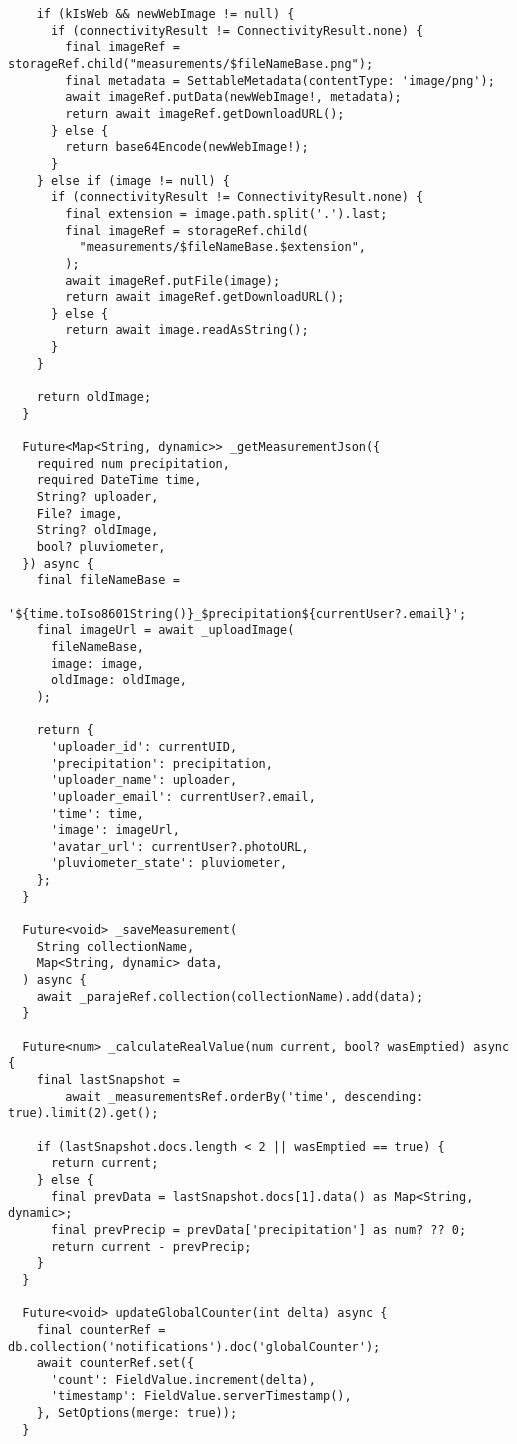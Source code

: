 \begin{verbatim}
    if (kIsWeb && newWebImage != null) {
      if (connectivityResult != ConnectivityResult.none) {
        final imageRef = storageRef.child("measurements/$fileNameBase.png");
        final metadata = SettableMetadata(contentType: 'image/png');
        await imageRef.putData(newWebImage!, metadata);
        return await imageRef.getDownloadURL();
      } else {
        return base64Encode(newWebImage!);
      }
    } else if (image != null) {
      if (connectivityResult != ConnectivityResult.none) {
        final extension = image.path.split('.').last;
        final imageRef = storageRef.child(
          "measurements/$fileNameBase.$extension",
        );
        await imageRef.putFile(image);
        return await imageRef.getDownloadURL();
      } else {
        return await image.readAsString();
      }
    }

    return oldImage;
  }

  Future<Map<String, dynamic>> _getMeasurementJson({
    required num precipitation,
    required DateTime time,
    String? uploader,
    File? image,
    String? oldImage,
    bool? pluviometer,
  }) async {
    final fileNameBase =
        '${time.toIso8601String()}_$precipitation${currentUser?.email}';
    final imageUrl = await _uploadImage(
      fileNameBase,
      image: image,
      oldImage: oldImage,
    );

    return {
      'uploader_id': currentUID,
      'precipitation': precipitation,
      'uploader_name': uploader,
      'uploader_email': currentUser?.email,
      'time': time,
      'image': imageUrl,
      'avatar_url': currentUser?.photoURL,
      'pluviometer_state': pluviometer,
    };
  }

  Future<void> _saveMeasurement(
    String collectionName,
    Map<String, dynamic> data,
  ) async {
    await _parajeRef.collection(collectionName).add(data);
  }

  Future<num> _calculateRealValue(num current, bool? wasEmptied) async {
    final lastSnapshot =
        await _measurementsRef.orderBy('time', descending: true).limit(2).get();

    if (lastSnapshot.docs.length < 2 || wasEmptied == true) {
      return current;
    } else {
      final prevData = lastSnapshot.docs[1].data() as Map<String, dynamic>;
      final prevPrecip = prevData['precipitation'] as num? ?? 0;
      return current - prevPrecip;
    }
  }

  Future<void> updateGlobalCounter(int delta) async {
    final counterRef = db.collection('notifications').doc('globalCounter');
    await counterRef.set({
      'count': FieldValue.increment(delta),
      'timestamp': FieldValue.serverTimestamp(),
    }, SetOptions(merge: true));
  }


\end{verbatim}

